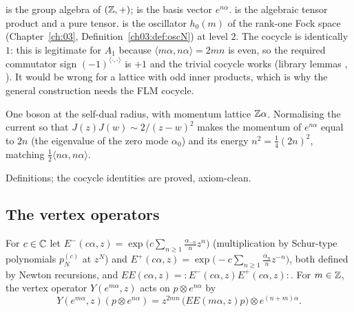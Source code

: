 \begin{dictionary}
 is the group algebra of $({\mathbb{Z}},+)$;  is the basis vector $e^{n\alpha}$.
 is the algebraic tensor product and  a pure tensor.  is the oscillator
$h_0(m)$ of the rank-one Fock space  (Chapter~\ref{ch:03}, Definition~\ref{ch03:def:oscN}) at level
\textbf{$2$}. The cocycle is identically $1$: this is legitimate for $A_1$ because $\langle m\alpha,n\alpha\rangle=2mn$
is even, so the required commutator sign $(-1)^{\langle\cdot,\cdot\rangle}$ is $+1$ and the trivial cocycle works
(library lemmas , ). It would be wrong for a lattice with odd inner
products, which is why the general construction needs the FLM cocycle.
\end{dictionary}

\begin{physics}
One boson at the self-dual radius, with momentum lattice ${\mathbb{Z}}\alpha$. Normalising the current so that
$J(z)J(w)\sim2/(z-w)^2$ makes the momentum of $e^{n\alpha}$ equal to $2n$ (the eigenvalue of the zero mode
$\alpha_0$) and its energy $n^2=\frac14(2n)^2$, matching $\frac12\langle n\alpha,n\alpha\rangle$.
\end{physics}

\begin{status}
Definitions; the cocycle identities are proved, axiom-clean.
\end{status}

\subsection{The vertex operators}

\begin{definition}[$Y(e^{m\alpha},z)$]\label{l05:def:Yemalpha}
For $c\in{\mathbb{C}}$ let $E^-(c\alpha,z)=\exp\big(c\sum_{n\ge1}\frac{\alpha_{-n}}nz^n\big)$ (multiplication by Schur-type
polynomials $p^{(c)}_N$ at $z^N$) and $E^+(c\alpha,z)=\exp\big(-c\sum_{n\ge1}\frac{\alpha_n}nz^{-n}\big)$, both defined
by Newton recursions, and $EE(c\alpha,z)={:}E^-(c\alpha,z)E^+(c\alpha,z){:}$. For $m\in{\mathbb{Z}}$, the vertex operator
$Y(e^{m\alpha},z)$ acts on $p\otimes e^{n\alpha}$ by
\begin{equation*}
 Y(e^{m\alpha},z)(p\otimes e^{n\alpha})=z^{2mn}\,\big(EE(m\alpha,z)p\big)\otimes e^{(n+m)\alpha}.
\end{equation*}
\end{definition}

